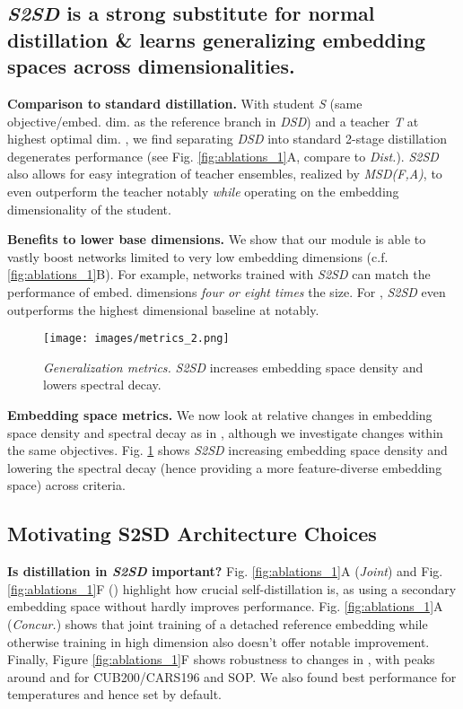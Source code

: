 \documentclass{article} \usepackage{arxiv_style,times}
\begin{document}
\subsection{\textit{S2SD} is a strong substitute for normal distillation \& learns generalizing embedding spaces across dimensionalities.}\label{sec:further_exp}
\textbf{Comparison to standard distillation.} 
With student \textit{S} (same objective/embed. 
dim. as the reference branch in \textit{DSD})
and a teacher \textit{T} at highest optimal dim. , 
we find separating \textit{DSD} into standard 2-stage distillation degenerates performance (see Fig. \ref{fig:ablations_1}A, compare to \textit{Dist.}). 
\textit{S2SD} also allows for easy integration of teacher ensembles, realized by \textit{MSD(F,A)}, to even outperform the teacher notably \textit{while}
operating on the embedding dimensionality of the student.

\textbf{Benefits to lower base dimensions.} We show that our module is able to vastly boost networks limited to very low embedding dimensions (c.f. \ref{fig:ablations_1}B). 
For example,  networks trained with \textit{S2SD} can match the performance of embed. dimensions \textit{four or eight times} the size. For , \textit{S2SD} even outperforms the highest dimensional baseline at  notably.

\begin{figure}[t]
    \centering
    \texttt{[image: images/metrics\_2.png]}
    \caption{\textit{Generalization metrics.} \textit{S2SD} increases embedding space density and lowers spectral decay.}
    \label{fig:metrics}
\end{figure}
\vspace{-10pt}     \textbf{Embedding space metrics.} 
We now look at relative changes in embedding space density
and spectral decay as in \cite{roth2020revisiting}, although we investigate changes within the same objectives.
Fig. \ref{fig:metrics} shows \textit{S2SD} increasing embedding space density and lowering the spectral decay (hence providing a more feature-diverse embedding space) across criteria. 

\subsection{Motivating S2SD Architecture Choices}\label{sec:ablations}
\textbf{Is distillation in \textit{S2SD} important?} Fig. \ref{fig:ablations_1}A (\textit{Joint}) and Fig. \ref{fig:ablations_1}F () highlight how crucial self-distillation is, as using a secondary embedding space without hardly improves performance. Fig. \ref{fig:ablations_1}A (\textit{Concur.}) shows that joint training of a detached reference embedding  while otherwise training in high dimension also doesn't offer notable improvement. Finally, Figure \ref{fig:ablations_1}F shows robustness to changes in , with peaks around  and  for CUB200/CARS196 and SOP. We also found best performance for temperatures  and hence set  by default.
\end{document}
